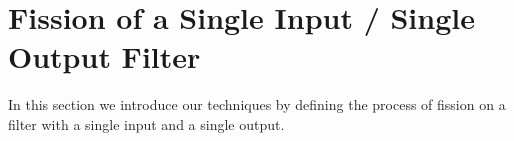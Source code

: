 \section{Fission of a Single Input / Single Output Filter}
\label{sec:single}
In this section we introduce our techniques by defining the
process of fission on a filter with a single input and a single
output.  